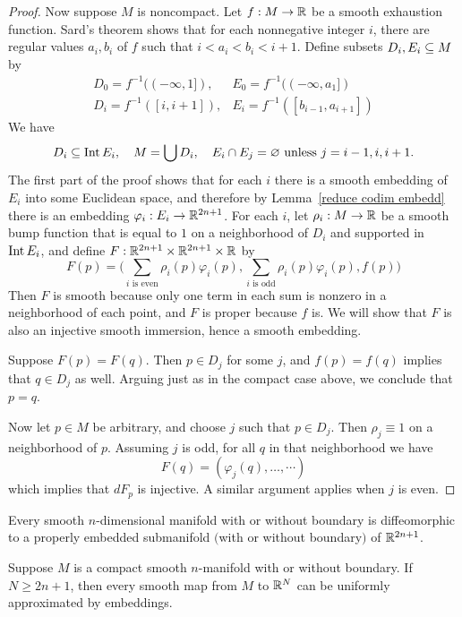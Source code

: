 \begin{proof}
Now suppose $M$ is noncompact. Let $f:M\to\mathbb{R}$ be a smooth exhaustion function. Sard's theorem shows that for each nonnegative integer $i$, there are regular values $a_i,b_i$ of $f$ such that $i<a_i<b_i<i+1$. Define subsets $D_i,E_i\subseteq M$ by
\[\begin{array}{ll}
D_0=f^{-1}((-\infty,1]),& E_0=f^{-1}((-\infty,a_1])\\
D_i=f^{-1}([i,i+1]),&E_i=f^{-1}([b_{i-1},a_{i+1}])
\end{array}\]
We have 
\[D_i\subseteq\mathrm{Int}\, E_i,\quad M=\bigcup D_i,\quad E_i\cap E_j=\varnothing\text{ unless $j=i-1,i,i+1$}.\] 
The first part of the proof shows that for each $i$ there is a smooth embedding of $E_i$ into some Euclidean space, and therefore by Lemma~\ref{reduce codim embedd} there is an embedding $\varphi_i:E_i\to\mathbb{R}^{2n+1}$. For each $i$, let $\rho_i:M\to\mathbb{R}$ be a smooth bump function that is equal to $1$ on a neighborhood of $D_i$ and supported in $\mathrm{Int}\, E_i$, and define $F:\mathbb{R}^{2n+1}\times\mathbb{R}^{2n+1}\times\mathbb{R}$ by
\[F(p)=\Big(\sum_{\text{$i$ is even}}\rho_i(p)\varphi_i(p),\sum_{\text{$i$ is odd}}\rho_i(p)\varphi_i(p),f(p)\Big)\]
Then $F$ is smooth because only one term in each sum is nonzero in a neighborhood of each point, and $F$ is proper because $f$ is. We will show that $F$ is also an injective smooth immersion, hence a smooth embedding.\par
Suppose $F(p)=F(q)$. Then $p\in D_j$ for some $j$, and $f(p)=f(q)$ implies that $q\in D_j$ as well. Arguing just as in the compact case above, we conclude that $p=q$.\par 
Now let $p\in M$ be arbitrary, and choose $j$ such that $p\in D_j$. Then $\rho_j\equiv 1$ on a neighborhood of $p$. Assuming $j$ is odd, for all $q$ in that neighborhood we have
\[F(q)=(\varphi_j(q),\dots,\cdots)\]
which implies that $dF_p$ is injective. A similar argument applies when $j$ is even.
\end{proof}
\begin{corollary}
Every smooth $n$-dimensional manifold with or without boundary is diffeomorphic to a properly embedded submanifold $($with or without boundary$)$ of $\mathbb{R}^{2n+1}$.
\end{corollary}
\begin{corollary}
Suppose $M$ is a compact smooth $n$-manifold with or without boundary. If $N\geq2n+1$, then every smooth map from $M$ to $\mathbb{R}^N$ can be uniformly approximated by embeddings.
\end{corollary}
